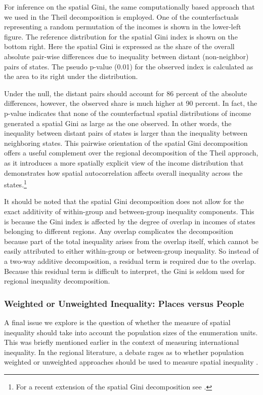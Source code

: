 \documentclass[
  a4paper, 
  twoside,
  final
]{article}
\begin{document}
For inference on the spatial Gini, the same computationally based
approach that we used in the Theil decomposition is employed. One of the
counterfactuals representing a random permutation of the incomes is
shown in the lower-left figure. The reference distribution for the
spatial Gini index is shown on the bottom right. Here the spatial Gini
is expressed as the share of the overall absolute pair-wise differences
due to inequality between distant (non-neighbor) pairs of states. The
pseudo p-value (0.01) for the observed index is calculated as the area
to its right under the distribution.

Under the null, the distant pairs should account for 86 percent of the
absolute differences, however, the observed share is much higher at 90
percent. In fact, the p-value indicates that none of the counterfactual
spatial distributions of income generated a spatial Gini as large as the
one observed. In other words, the inequality between distant pairs of
states is larger than the inequality between neighboring states. This
pairwise orientation of the spatial Gini decomposition offers a useful
complement over the regional decomposition of the Theil approach, as it
introduces a more spatially explicit view of the income distribution
that demonstrates how spatial autocorrelation affects overall inequality
across the states.\footnote{For a recent extension of the spatial Gini
  decomposition see \citet{panzera2020MeasuringSpatial}.}

It should be noted that the spatial Gini decomposition does not allow
for the exact additivity of within-group and between-group inequality
components. This is because the Gini index is affected by the degree of
overlap in incomes of states belonging to different regions. Any overlap
complicates the decomposition because part of the total inequality
arises from the overlap itself, which cannot be easily attributed to
either within-group or between-group inequality. So instead of a two-way
additive decomposition, a residual term is required due to the overlap.
Because this residual term is difficult to interpret, the Gini is seldom
used for regional inequality decomposition.

\subsubsection{Weighted or Unweighted Inequality: Places versus
People}\label{weighted-or-unweighted-inequality-places-versus-people}

A final issue we explore is the question of whether the measure of
spatial inequality should take into account the population sizes of the
enumeration units. This was briefly mentioned earlier in the context of
measuring international inequality. In the regional literature, a debate
rages as to whether population weighted or unweighted approaches should
be used to measure spatial inequality
\citep{gluschenko2018MeasuringRegional} .
\end{document}

